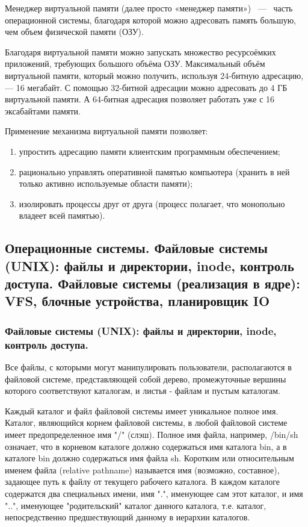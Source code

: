 \documentclass{article}
\begin{document}
Менеджер виртуальной памяти (далее просто «менеджер памяти») ~---~ часть операционной системы, благодаря которой можно адресовать память большую, чем объем физической памяти (ОЗУ).

Благодаря виртуальной памяти можно запускать множество ресурсоёмких приложений, требующих большого объёма ОЗУ. Максимальный объём виртуальной памяти, который можно получить, используя 24-битную адресацию, — 16 мегабайт. С помощью 32-битной адресации можно адресовать до 4 ГБ виртуальной памяти. А 64-битная адресация позволяет работать уже с 16 эксабайтами памяти.

Применение механизма виртуальной памяти позволяет:

\begin{enumerate}
	\item упростить адресацию памяти клиентским программным обеспечением;
	\item рационально управлять оперативной памятью компьютера (хранить в ней только активно используемые области памяти);
	\item изолировать процессы друг от друга (процесс полагает, что монопольно владеет всей памятью).
\end{enumerate}

\subsection{Операционные системы. Файловые системы (UNIX): файлы и директории, inode, контроль доступа. Файловые системы (реализация в ядре): VFS, блочные устройства, планировщик IO}

\subsubsection{Файловые системы (UNIX): файлы и директории, inode, контроль доступа.}

Все файлы, с которыми могут манипулировать пользователи, располагаются в файловой системе, представляющей собой дерево, промежуточные вершины которого соответствуют каталогам, и листья - файлам и пустым каталогам. 

Каждый каталог и файл файловой системы имеет уникальное полное имя. Каталог, являющийся корнем файловой системы, в любой файловой системе имеет предопределенное имя "/" (слэш). Полное имя файла, например, /bin/sh означает, что в корневом каталоге должно содержаться имя каталога bin, а в каталоге bin должно содержаться имя файла sh. 
Коротким или относительным именем файла (relative pathname) называется имя (возможно, составное), задающее путь к файлу от текущего рабочего каталога. 
В каждом каталоге содержатся два специальных имени, имя ".", именующее сам этот каталог, и имя "..", именующее "родительский" каталог данного каталога, т.е. каталог, непосредственно предшествующий данному в иерархии каталогов.
\end{document}
